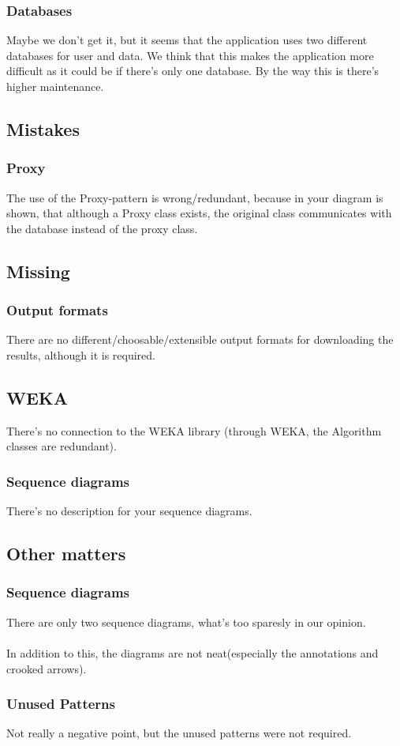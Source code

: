 \documentclass{article}
\begin{document}
\subsubsection{Databases}
Maybe we don't get it, but it seems that the application uses two different databases for user and data. We think that this makes the application more difficult as it could be if there's only one database. By the way this is there's higher maintenance.
\subsection{Mistakes}
\subsubsection{Proxy}
The use of the Proxy-pattern is wrong/redundant, because in your diagram is shown, that although a Proxy class exists, the original class communicates with the database instead of the proxy class.
\subsection{Missing}
\subsubsection{Output formats}
There are no different/choosable/extensible output formats for downloading the results, although it is required.
\subsection{WEKA}
There's no connection to the WEKA library (through WEKA, the Algorithm classes are redundant).
\subsubsection{Sequence diagrams}
There's no description for your sequence diagrams.
\subsection{Other matters}
\subsubsection{Sequence diagrams}
There are only two sequence diagrams, what's too sparesly in our opinion.\\\\
In addition to this, the diagrams are not neat(especially the annotations and crooked arrows).
\subsubsection{Unused Patterns}
Not really a negative point, but the unused patterns were not required.
\end{document}
